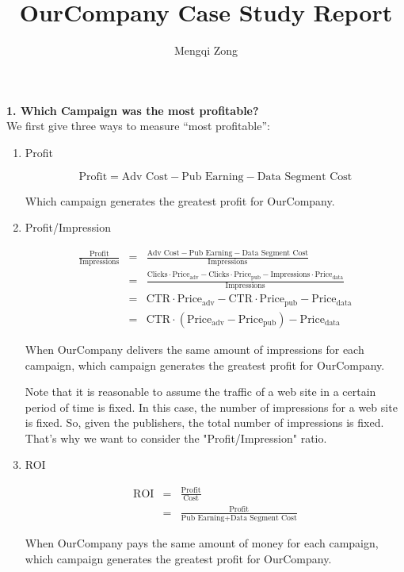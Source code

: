 \documentclass[12pt]{article}
\title{OurCompany Case Study Report}
\author{Mengqi Zong}
\begin{document}
\maketitle

\setlength{\parindent}{0in}

{\bf 1. Which Campaign was the most profitable?} \\

We first give three ways to measure ``most profitable'':

\begin{enumerate}
\item Profit

	\begin{equation*}
		\text{Profit} = \text{Adv Cost} - \text{Pub Earning} - \text{Data Segment Cost}
	\end{equation*}

	Which campaign generates the greatest profit for OurCompany.

\item Profit/Impression

	\begin{eqnarray*}
		\frac {\text{Profit}}{\text{Impressions}}
        &=& \frac {\text{Adv Cost} - \text{Pub Earning} - \text{Data Segment Cost}}{\text{Impressions}} \\
        &=& \frac {\text{Clicks} \cdot \text{Price}_{\text{adv}} - \text{Clicks} \cdot \text{Price}_{\text{pub}}  - \text{Impressions} \cdot \text{Price}_{\text{data}}}{\text{Impressions}} \\
        &=& \text{CTR} \cdot \text{Price}_{\text{adv}} - \text{CTR} \cdot \text{Price}_{\text{pub}} - \text{Price}_{\text{data}} \\
        &=& \text{CTR} \cdot (\text{Price}_{\text{adv}} - \text{Price}_{\text{pub}}) - \text{Price}_{\text{data}}
	\end{eqnarray*}

    When OurCompany delivers the same amount of impressions for each campaign, which campaign generates the greatest profit for OurCompany.

    Note that it is reasonable to assume the traffic of a web site in a certain period of time is fixed. In this case, the number of impressions for a web site is fixed. So, given the publishers, the total number of impressions is fixed. That's why we want to consider the "Profit/Impression" ratio.
	
\item ROI

	\begin{eqnarray*}
		\text{ROI} &=& \frac {\text{Profit}} {\text{Cost}} \\
				   &=& \frac {\text{Profit}} {\text{Pub Earning} + \text{Data Segment Cost}}
	\end{eqnarray*}
	
    When OurCompany pays the same amount of money for each campaign, which campaign generates the greatest profit for OurCompany.
\end{enumerate}
\end{document}
